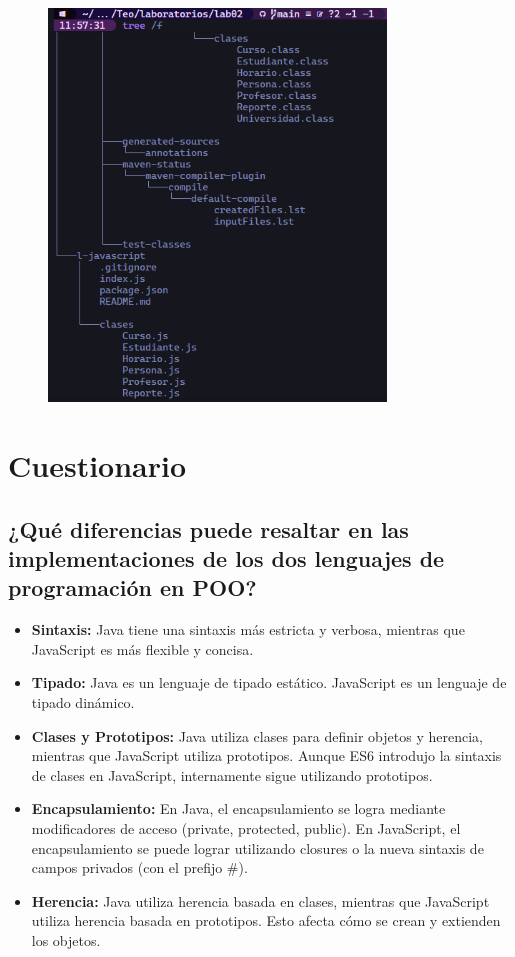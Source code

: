 \begin{figure}[H]
    \centering
    \includegraphics[width=0.8\textwidth]{img/estructura03.png}
\end{figure}




\section{Cuestionario}

\subsection{¿Qué diferencias puede resaltar en las implementaciones de los dos lenguajes de programación en POO?}

\begin{itemize}
    \item \textbf{Sintaxis:} Java tiene una sintaxis más estricta y verbosa, mientras que JavaScript es más flexible y concisa.
    \item \textbf{Tipado:} Java es un lenguaje de tipado estático. JavaScript es un lenguaje de tipado dinámico.
    \item \textbf{Clases y Prototipos:} Java utiliza clases para definir objetos y herencia, mientras que JavaScript utiliza prototipos. Aunque ES6 introdujo la sintaxis de clases en JavaScript, internamente sigue utilizando prototipos.
    \item \textbf{Encapsulamiento:} En Java, el encapsulamiento se logra mediante modificadores de acceso (private, protected, public). En JavaScript, el encapsulamiento se puede lograr utilizando closures o la nueva sintaxis de campos privados (con el prefijo #).
    \item \textbf{Herencia:} Java utiliza herencia basada en clases, mientras que JavaScript utiliza herencia basada en prototipos. Esto afecta cómo se crean y extienden los objetos.
\end{itemize}


